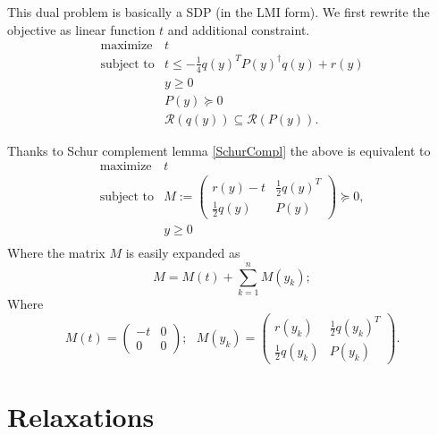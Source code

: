 \documentclass[10pt,oneside]{book}
\theoremstyle{definition}
\begin{document}
This dual problem is basically a SDP (in the LMI form). We first rewrite the objective as linear function $t$ and additional constraint.
\begin{equation}
\begin{array}{ll}
\mbox{maximize} & t \\
\mbox{subject to}&  t\leq -\frac{1}{4}q(y)^TP(y)^{\dagger}q(y) + r(y) \\
&y \geq 0\\
& P(y )\succeq 0\\
& \mathcal{R}(q(y)) \subseteq \mathcal{R}(P(y)).
\end{array} 
\end{equation}

Thanks to Schur complement lemma \ref{SchurCompl} the above is equivalent to
\begin{equation}
\begin{array}{ll}
\mbox{maximize} & t \\
\mbox{subject to}& M:=\left(\begin{array}{ll}
r(y)-t & \frac{1}{2}q(y)^T \\
\frac{1}{2}q(y) & P(y)
\end{array}\right)\succeq 0,
 \\
&y \geq 0\\
\end{array} 
\end{equation}
Where the matrix $M$ is easily expanded as 
\begin{equation}
M=M(t) + \sum_{k=1}^n M(y_k); 
\end{equation}
Where
\begin{equation}
M(t) = \left(\begin{array}{rr} -t& 0\\ 0 & 0 \end{array}\right) ; \ \ \ 
M(y_k) = \left(\begin{array}{ll} r(y_k)& \frac{1}{2}q(y_k)^T\\ \frac{1}{2}q(y_k) & P(y_k) \end{array}\right) . 
\end{equation}













\section{Relaxations}
\end{document}
